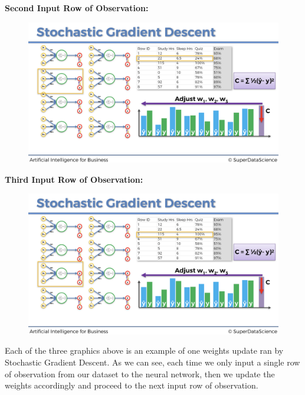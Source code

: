 \documentclass[]{book}
\begin{document}
\newpage

\textbf{Second Input Row of Observation:}

\begin{figure}[!htbp]
        \begin{center}
            \includegraphics[scale=0.18]{ANN_28.png}
        \end{center}
\end{figure}

\textbf{Third Input Row of Observation:}

\begin{figure}[!htbp]
        \begin{center}
            \includegraphics[scale=0.18]{ANN_29.png}
        \end{center}
\end{figure}

Each of the three graphics above is an example of one weights update ran by Stochastic Gradient Descent. As we can see, each time we only input a single row of observation from our dataset to the neural network, then we update the weights accordingly and proceed to the next input row of observation.
\end{document}
